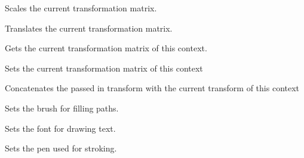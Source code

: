 Scales the current transformation matrix.

\label{wxgraphicscontexttranslate}


Translates the current transformation matrix.

\label{wxgraphicscontextgettransform}


Gets the current transformation matrix of this context.

\label{wxgraphicscontextsettransform}


Sets the current transformation matrix of this context

\label{wxgraphicscontextconcattransform}


Concatenates the passed in transform with the current transform of this context

\label{wxgraphicscontextsetbrush}



Sets the brush for filling paths.

\label{wxgraphicscontextsetfont}




Sets the font for drawing text.


\label{wxgraphicscontextsetpen}



Sets the pen used for stroking.

